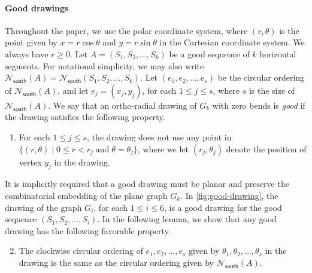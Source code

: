 \documentclass{article}\usepackage[a4paper,margin=20mm]{geometry}
\newcommand{\Nsouth}{\mathcal{N}_\mathsf{south}}
\begin{document}
\paragraph{Good drawings} Throughout the paper, we use the polar coordinate system, where $(r,\theta)$ is the point given by $x = r \cos{\theta}$ and $y= r \sin{\theta}$ in the Cartesian coordinate system. We always have $r \geq 0$.
Let $A = (S_1, S_2, \ldots, S_{k})$ be a good sequence of $k$ horizontal segments. For notational simplicity, we may also write $\Nsouth(A) = \Nsouth(S_1, S_2, \ldots, S_{k})$. Let $(e_1, e_2, \ldots, e_s)$ be the circular ordering of $\Nsouth(A)$, and let $e_j=(x_j, y_j)$, for each $1 \leq j \leq s$, where $s$ is the size of $\Nsouth(A)$.  We say that an ortho-radial drawing of $G_k$ with zero bends is \emph{good} if the drawing satisfies the following property. 
\begin{enumerate}[(D1)]
\item \label{item:D1} For each $1 \leq j \leq s$, the drawing does not use any point in $\{ (r,\theta) \mid 0\leq r < r_j \; \text{and} \; \theta = \theta_j\}$, where we let $(r_j, \theta_j)$ denote the position of  vertex $y_j$ in the drawing.
\end{enumerate}
It is implicitly required that a good drawing must be planar and preserve the combinatorial embedding of the plane graph $G_k$. In \cref{fig:good-drawing}, the drawing of the graph $G_i$, for each $1 \leq i \leq 6$, is a good drawing for the good sequence $(S_1, S_2, \ldots, S_i)$. In the following lemma, we show that any good drawing has the following favorable property.



\begin{enumerate}[(D1)]\setcounter{enumi}{1}
\item \label{item:D2} The clockwise circular ordering of $e_1, e_2, \ldots, e_s$ given by $\theta_1, \theta_2, \ldots, \theta_s$ in the drawing is the same as the circular ordering given by $\Nsouth(A)$.
\end{enumerate}
\end{document}
